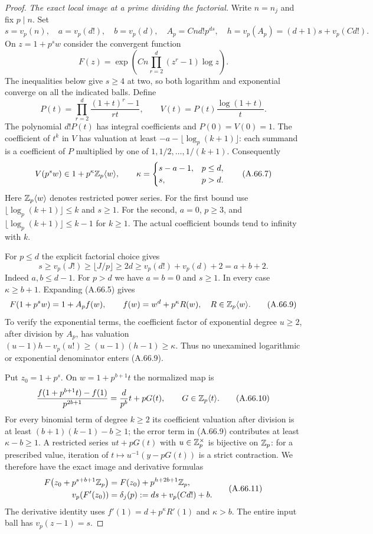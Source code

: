 \begin{proof}
\emph{The exact local image at a prime dividing the factorial.}
Write $n=n_j$ and fix $p\mid n$.  Set
\[
 s=v_p(n),\quad a=v_p(d!),\quad b=v_p(d),\quad
 A_p=Cnd!p^{ds},\quad h=v_p(A_p)=(d+1)s+v_p(Cd!).
 \tag{A.66.4}
\]
On $z=1+p^s w$ consider the convergent function
\[
 F(z)=\exp\left(Cn\prod_{r=2}^d(z^r-1)\log z\right).
 \tag{A.66.5}
\]
The inequalities below give $s\ge4$ at two, so both logarithm
and exponential converge on all the indicated balls.
Define
\[
 P(t)=\prod_{r=2}^d\frac{(1+t)^r-1}{rt},\qquad
 V(t)=P(t)\frac{\log(1+t)}t.
 \tag{A.66.6}
\]
The polynomial $d!P(t)$ has integral coefficients and
$P(0)=V(0)=1$.  The coefficient of $t^k$ in $V$ has valuation
at least $-a-\lfloor\log_p(k+1)\rfloor$: each summand is a
coefficient of $P$ multiplied by one of
$1,1/2,\ldots,1/(k+1)$.  Consequently
\[
 V(p^sw)\in1+p^\kappa\mathbb Z_p\langle w\rangle,
 \qquad
 \kappa=
 \begin{cases}s-a-1,&p\le d,\\s,&p>d.\end{cases}
 \tag{A.66.7}
\]
Here $\mathbb Z_p\langle w\rangle$ denotes restricted power series.
For the first bound use
$\lfloor\log_p(k+1)\rfloor\le k$ and $s\ge1$.
For the second, $a=0$, $p\ge3$, and
$\lfloor\log_p(k+1)\rfloor\le k-1$ for $k\ge1$.
The actual coefficient bounds tend to infinity with $k$.

For $p\le d$ the explicit factorial choice gives
\[
 s\ge v_p(J!)\ge\lfloor J/p\rfloor\ge2d
           \ge v_p(d!)+v_p(d)+2=a+b+2.
 \tag{A.66.8}
\]
Indeed $a,b\le d-1$.  For $p>d$ we have $a=b=0$ and
$s\ge1$.  In every case $\kappa\ge b+1$.
Expanding (A.66.5) gives
\[
 F(1+p^s w)=1+A_p f(w),\qquad
                 f(w)=w^d+p^\kappa R(w),
            \quad R\in\mathbb Z_p\langle w\rangle.
 \tag{A.66.9}
\]
To verify the exponential terms, the coefficient factor of
exponential degree $u\ge2$, after division by $A_p$, has
valuation $(u-1)h-v_p(u!)\ge(u-1)(h-1)\ge\kappa$.
Thus no unexamined logarithmic or exponential denominator
enters (A.66.9).

Put $z_0=1+p^s$.  On $w=1+p^{b+1}t$ the normalized map is
\[
 \frac{f(1+p^{b+1}t)-f(1)}{p^{2b+1}}
                 =\frac{d}{p^b}t+pG(t),
                    \qquad G\in\mathbb Z_p\langle t\rangle.
 \tag{A.66.10}
\]
For every binomial term of degree $k\ge2$ its coefficient
valuation after division is at least
$(b+1)(k-1)-b\ge1$; the error term in (A.66.9) contributes
at least $\kappa-b\ge1$.
A restricted series $ut+pG(t)$ with $u\in\mathbb Z_p^\times$ is
bijective on $\mathbb Z_p$: for a prescribed value, iteration of
$t\mapsto u^{-1}(y-pG(t))$ is a strict contraction.
We therefore have the exact image and derivative formulas
\[
 \begin{split}
 F\bigl(z_0+p^{s+b+1}\mathbb Z_p\bigr)
       &=F(z_0)+p^{h+2b+1}\mathbb Z_p,\\
 v_p(F'(z_0))&=\delta_j(p):=ds+v_p(Cd!)+b.
 \end{split}
 \tag{A.66.11}
\]
The derivative identity uses $f'(1)=d+p^\kappa R'(1)$
and $\kappa>b$.  The entire input ball has $v_p(z-1)=s$.


\end{proof}
